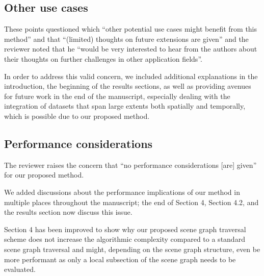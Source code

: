 \documentclass{article}
\begin{document}
\vspace*{1cm}

\begin{tcolorbox}
\subsection{Other use cases}\label{concern:applications}
These points questioned which ``other potential use cases might benefit from this method'' and that ``(limited) thoughts on future extensions are given'' and the reviewer noted that he ``would be very interested to hear from the authors about their thoughts on further challenges in other application fields''.
\end{tcolorbox}
In order to address this valid concern, we included additional explanations in the introduction, the beginning of the results sections, as well as providing avenues for future work in the end of the manuscript, especially dealing with the integration of datasets that span large extents both spatially and temporally, which is possible due to our proposed method.

\vspace*{1cm}

\begin{tcolorbox}
\subsection{Performance considerations}\label{concern:performance}
The reviewer raises the concern that ``no performance considerations [are] given'' for our proposed method.
\end{tcolorbox}
We added discussions about the performance implications of our method in multiple places throughout the manuscript; the end of Section 4, Section 4.2, and the results section now discuss this issue.

Section 4 has been improved to show why our proposed scene graph traversal scheme does not increase the algorithmic complexity compared to a standard scene graph traversal and might, depending on the scene graph structure, even be more performant as only a local subsection of the scene graph needs to be evaluated.
\end{document}
